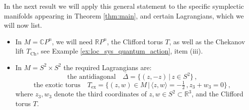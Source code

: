 \documentclass[11pt%
]{article}
\theoremstyle{definition}
\newcommand{\R}{{\mathbb{R}}}
\newcommand{\C}{{\mathbb{C}}}
\newcommand{\ol}{\overline}
\DeclareMathOperator{\0}{\operatorname{\mathbf{0}}}
\begin{document}
In the next result we will apply this general statement to the specific symplectic manifolds appearing in Theorem \ref{thm:main}, and certain Lagrangians, which we will now list.
\begin{itemize}
  \item In $M=\C P^n$, we will need $\R P^n$, the Clifford torus $T$, as well as the Chekanov lift $T_{\mathrm{Ch}}$, see Example \ref{ex:loc_sys_quantum_action}, item (iii).
  \item In $M=S^2\times S^2$ the required Lagrangians are:
        $$\text{the antidiagonal}\quad\ol \Delta = \{(z,-z)\,|\,z\in S^2\}\,,$$
        $$\text{the exotic torus}\quad T_{\mathrm{ex}} = \{(z,w) \in M\,|\,\langle z,w\rangle = -\tfrac 12\,,z_3+w_3=0\}\,,$$
      where $z_3,w_3$ denote the third coordinates of $z,w\in S^2\subset \R^3$, and the Clifford torus $T$.
\end{itemize}
\end{document}
